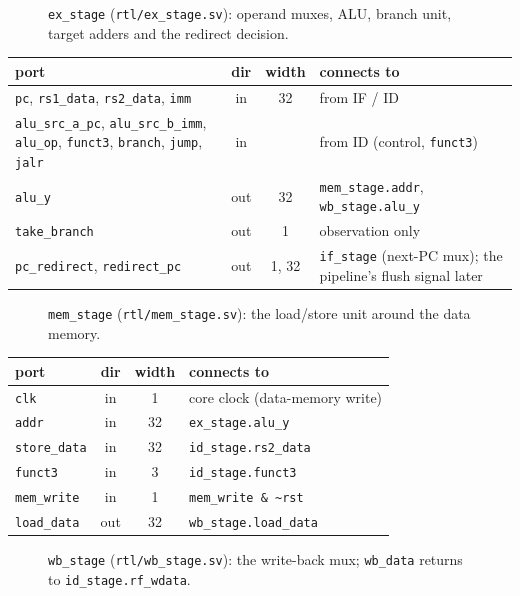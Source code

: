 \documentclass[10pt]{article}
\newcommand{\sv}[1]{\texttt{#1}}
\begin{document}
\clearpage
\begin{figure}[h]
  \centering
  
  \caption{\sv{ex\_stage} (\sv{rtl/ex\_stage.sv}): operand muxes, ALU, branch unit, target adders and the redirect decision.}
\end{figure}
\begin{center}\small
\begin{tabular}{l c c L{11cm}}
\toprule
port & dir & width & connects to\\ \midrule
\sv{pc}, \sv{rs1\_data}, \sv{rs2\_data}, \sv{imm} & in & 32 & from IF / ID\\
\sv{alu\_src\_a\_pc}, \sv{alu\_src\_b\_imm}, \sv{alu\_op}, \sv{funct3}, \sv{branch}, \sv{jump}, \sv{jalr} & in & & from ID (control, \sv{funct3})\\
\sv{alu\_y} & out & 32 & \sv{mem\_stage.addr}, \sv{wb\_stage.alu\_y}\\
\sv{take\_branch} & out & 1 & observation only\\
\sv{pc\_redirect}, \sv{redirect\_pc} & out & 1, 32 & \sv{if\_stage} (next-PC mux); the pipeline's flush signal later\\ \bottomrule
\end{tabular}
\end{center}

\clearpage
\begin{figure}[h]
  \centering
  
  \caption{\sv{mem\_stage} (\sv{rtl/mem\_stage.sv}): the load/store unit around the data memory.}
\end{figure}
\begin{center}\small
\begin{tabular}{l c c L{11cm}}
\toprule
port & dir & width & connects to\\ \midrule
\sv{clk} & in & 1 & core clock (data-memory write)\\
\sv{addr} & in & 32 & \sv{ex\_stage.alu\_y}\\
\sv{store\_data} & in & 32 & \sv{id\_stage.rs2\_data}\\
\sv{funct3} & in & 3 & \sv{id\_stage.funct3}\\
\sv{mem\_write} & in & 1 & \sv{mem\_write \& \textasciitilde rst}\\
\sv{load\_data} & out & 32 & \sv{wb\_stage.load\_data}\\ \bottomrule
\end{tabular}
\end{center}

\bigskip
\begin{figure}[h]
  \centering
  
  \caption{\sv{wb\_stage} (\sv{rtl/wb\_stage.sv}): the write-back mux; \sv{wb\_data} returns to \sv{id\_stage.rf\_wdata}.}
\end{figure}
\end{document}
